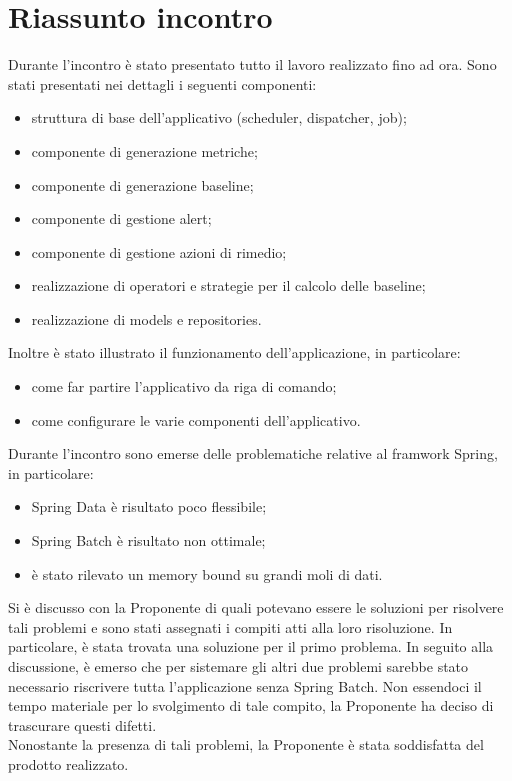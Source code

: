 \section{Riassunto incontro}
Durante l'incontro è stato presentato tutto il lavoro realizzato fino ad ora. Sono stati presentati nei dettagli i seguenti componenti:
\begin{itemize}
	\item struttura di base dell'applicativo (scheduler, dispatcher, job);
	\item componente di generazione metriche;
	\item componente di generazione baseline;
	\item componente di gestione alert;
	\item componente di gestione azioni di rimedio;
	\item realizzazione di operatori e strategie per il calcolo delle baseline;
	\item realizzazione di models e repositories.
\end{itemize}
Inoltre è stato illustrato il funzionamento dell'applicazione, in particolare:
\begin{itemize}
	\item come far partire l'applicativo da riga di comando;
	\item come configurare le varie componenti dell'applicativo.
\end{itemize}
Durante l'incontro sono emerse delle problematiche relative al framwork Spring, in particolare:
\begin{itemize}
	\item Spring Data è risultato poco flessibile;
	\item Spring Batch è risultato non ottimale;
	\item è stato rilevato un memory bound su grandi moli di dati.
\end{itemize}
Si è discusso con la Proponente di quali potevano essere le soluzioni per risolvere tali problemi e sono stati assegnati i compiti atti alla loro risoluzione. In particolare, è stata trovata una soluzione per il primo problema. In seguito alla discussione, è emerso che per sistemare gli altri due problemi sarebbe stato necessario riscrivere tutta l'applicazione senza Spring Batch. Non essendoci il tempo materiale per lo svolgimento di tale compito, la Proponente ha deciso di trascurare questi difetti.\\
Nonostante la presenza di tali problemi, la Proponente è stata soddisfatta del prodotto realizzato.\\
